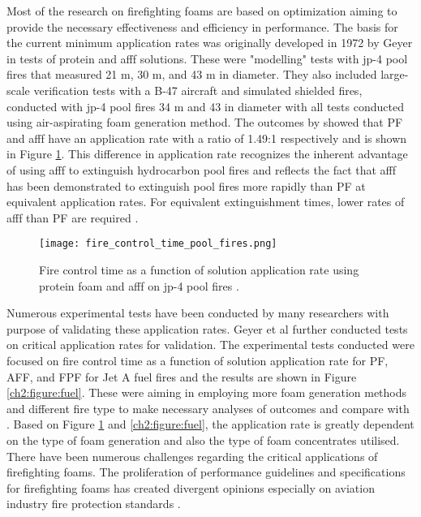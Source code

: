 Most of the research on firefighting foams are based on optimization aiming to provide the necessary effectiveness and efficiency in performance. The basis for the current minimum application rates was originally developed in 1972 by Geyer \cite{geyer1972evaluation} in tests of protein and \acrshort{afff} solutions. These were "modelling" tests with \acrfull{jp-4} pool fires that measured 21 m, 30 m, and 43 m in diameter. They also included large-scale verification tests with a B-47 aircraft and simulated shielded fires, conducted with \acrshort{jp-4} pool fires 34 m and 43 in diameter with all tests conducted using air-aspirating foam generation method. The outcomes by \cite{geyer1972evaluation} showed that PF and \acrshort{afff} have an application rate with a ratio of 1.49:1 respectively and is shown in Figure \ref{ch2:figure:pool}. This difference in application rate recognizes the inherent advantage of using \acrshort{afff} to extinguish hydrocarbon pool fires and reflects the fact that \acrshort{afff} has been demonstrated to extinguish pool fires more rapidly than PF at equivalent application rates. For equivalent extinguishment times, lower rates of \acrshort{afff} than PF are required \cite{scheffey1995evaluating}.

\begin{figure}[H]
    \centering
    \texttt{[image: fire\_control\_time\_pool\_fires.png]}
    \caption{Fire control time as a function of solution application rate using protein foam and \acrshort{afff} on \acrshort{jp-4} pool fires \cite{geyer1972evaluation}.}
    \label{ch2:figure:pool}
\end{figure}

Numerous experimental tests have been conducted by many researchers with purpose of validating these application rates. Geyer et al \cite{geyer1979comparative} further conducted tests on critical application rates for validation. The experimental tests conducted were focused on fire control time as a function of solution application rate for PF, AFF, and FPF for Jet A fuel fires and the results are shown in Figure \ref{ch2:figure:fuel}. These were aiming in employing more foam generation methods and different fire type to make necessary analyses of outcomes and compare with \cite{geyer1972evaluation}. Based on Figure \ref{ch2:figure:pool} and \ref{ch2:figure:fuel}, the application rate is greatly dependent on the type of foam generation and also the type of foam concentrates utilised. There have been numerous challenges regarding the critical applications of firefighting foams. The proliferation of performance guidelines and specifications for firefighting foams has created divergent opinions especially on aviation industry fire protection standards \cite{scheffey1995evaluating}.

